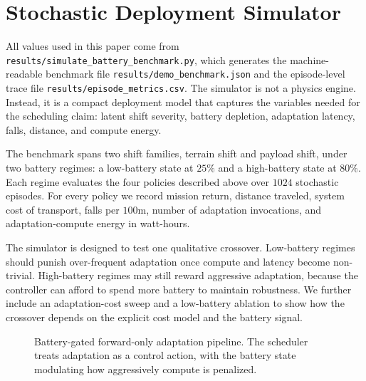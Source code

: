 \section{Stochastic Deployment Simulator}

All values used in this paper come from \texttt{results/simulate\_battery\_benchmark.py}, which generates the machine-readable benchmark file \texttt{results/demo\_benchmark.json} and the episode-level trace file \texttt{results/episode\_metrics.csv}. The simulator is not a physics engine. Instead, it is a compact deployment model that captures the variables needed for the scheduling claim: latent shift severity, battery depletion, adaptation latency, falls, distance, and compute energy.

The benchmark spans two shift families, terrain shift and payload shift, under two battery regimes: a low-battery state at $25\%$ and a high-battery state at $80\%$. Each regime evaluates the four policies described above over $1024$ stochastic episodes. For every policy we record mission return, distance traveled, system cost of transport, falls per $100$m, number of adaptation invocations, and adaptation-compute energy in watt-hours.

The simulator is designed to test one qualitative crossover. Low-battery regimes should punish over-frequent adaptation once compute and latency become non-trivial. High-battery regimes may still reward aggressive adaptation, because the controller can afford to spend more battery to maintain robustness. We further include an adaptation-cost sweep and a low-battery ablation to show how the crossover depends on the explicit cost model and the battery signal.

\begin{figure}[t]
\centering

\caption{Battery-gated forward-only adaptation pipeline. The scheduler treats adaptation as a control action, with the battery state modulating how aggressively compute is penalized.}
\label{fig:controller}
\end{figure}

